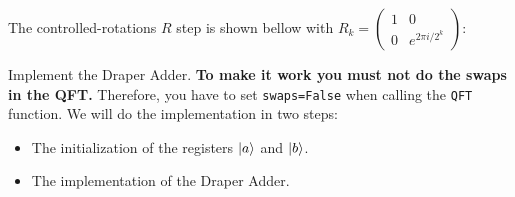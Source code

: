 \documentclass{article}
\begin{document}
The controlled-rotations $R$ step is shown bellow with $R_k=\begin{pmatrix}
    1 & 0 \\ 0 & e^{2\pi i/2^k}
\end{pmatrix}$:
\begin{figure}[H]
    \centering
\end{figure}

Implement the Draper Adder. \textbf{To make it work you must not do the swaps in the QFT.} Therefore, you have to set \verb|swaps=False| when calling the \verb|QFT| function. We will do the implementation in two steps:
    \begin{itemize}
        \item The initialization of the registers $\ket{a}$ and $\ket{b}$.
        \item The implementation of the Draper Adder.
    \end{itemize}
    
\end{document}
